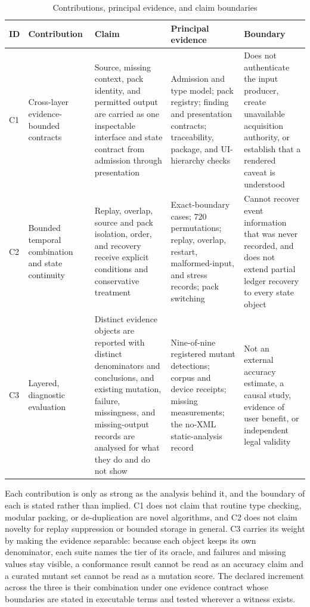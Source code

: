 \begin{table}[H]
\centering
\caption{Contributions, principal evidence, and claim boundaries}
\label{tab:contribution-map}
\scriptsize
\setlength{\tabcolsep}{3pt}
\begin{tabular}{>{\raggedright\arraybackslash}p{}>{\raggedright\arraybackslash}p{}>{\raggedright\arraybackslash}p{}>{\raggedright\arraybackslash}p{}>{\raggedright\arraybackslash}p{}}
\toprule
ID & Contribution & Claim & Principal evidence & Boundary \\
\midrule
C1 & Cross-layer evidence-bounded contracts & Source, missing context, pack identity, and permitted output are carried as one inspectable interface and state contract from admission through presentation & Admission and type model; pack registry; finding and presentation contracts; traceability, package, and UI-hierarchy checks & Does not authenticate the input producer, create unavailable acquisition authority, or establish that a rendered caveat is understood \\
C2 & Bounded temporal combination and state continuity & Replay, overlap, source and pack isolation, order, and recovery receive explicit conditions and conservative treatment & Exact-boundary cases; 720 permutations; replay, overlap, restart, malformed-input, and stress records; pack switching & Cannot recover event information that was never recorded, and does not extend partial ledger recovery to every state object \\
C3 & Layered, diagnostic evaluation & Distinct evidence objects are reported with distinct denominators and conclusions, and existing mutation, failure, missingness, and missing-output records are analysed for what they do and do not show & Nine-of-nine registered mutant detections; corpus and device receipts; missing measurements; the no-XML static-analysis record & Not an external accuracy estimate, a causal study, evidence of user benefit, or independent legal validity \\
\bottomrule
\end{tabular}
\end{table}

Each contribution is only as strong as the analysis behind it, and the boundary of each is stated rather than implied. C1 does not claim that routine type checking, modular packing, or de-duplication are novel algorithms, and C2 does not claim novelty for replay suppression or bounded storage in general. C3 carries its weight by making the evidence separable: because each object keeps its own denominator, each suite names the tier of its oracle, and failures and missing values stay visible, a conformance result cannot be read as an accuracy claim and a curated mutant set cannot be read as a mutation score. The declared increment across the three is their combination under one evidence contract whose boundaries are stated in executable terms and tested wherever a witness exists.

